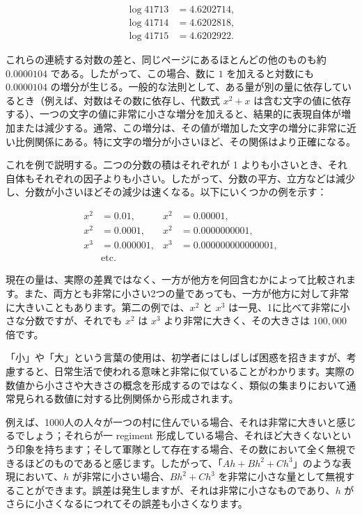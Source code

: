 \documentclass[a4paper,11pt,openany]{ltjsbook}
\begin{document}
\begin{align*}
\log 41713 &= 4.6202714, \\
\log 41714 &= 4.6202818, \\
\log 41715 &= 4.6202922.
\end{align*}

これらの連続する対数の差と、同じページにあるほとんどの他のものも約 $0.0000104$ である。したがって、この場合、数に $1$ を加えると対数にも $0.0000104$ の増分が生じる。一般的な法則として、ある量が別の量に依存しているとき（例えば、対数はその数に依存し、代数式 $x^2 + x$ は含む文字の値に依存する）、一つの文字の値に非常に小さな増分を加えると、結果的に表現自体が増加または減少する。通常、この増分は、その値が増加した文字の増分に非常に近い比例関係にある。特に文字の増分が小さいほど、その関係はより正確になる。

これを例で説明する。二つの分数の積はそれぞれが 1 よりも小さいとき、それ自体もそれぞれの因子よりも小さい。したがって、分数の平方、立方などは減少し、分数が小さいほどその減少は速くなる。以下にいくつかの例を示す：

\begin{align*}
x^2 &= 0.01, & x^2 &= 0.00001, \\
x^2 &= 0.0001, & x^2 &= 0.0000000001, \\
x^3 &= 0.000001, & x^3 &= 0.000000000000001, \\
& \text{etc.} &
\end{align*}

現在の量は、実際の差異ではなく、一方が他方を何回含むかによって比較されます。また、両方とも非常に小さい2つの量であっても、一方が他方に対して非常に大きいこともあります。第二の例では、$x^{2}$ と $x^{3}$ は一見、1に比べて非常に小さな分数ですが、それでも $x^{2}$ は $x^{3}$ より非常に大きく、その大きさは $100,000$ 倍です。

「小」や「大」という言葉の使用は、初学者にはしばしば困惑を招きますが、考慮すると、日常生活で使われる意味と非常に似ていることがわかります。実際の数値から小ささや大きさの概念を形成するのではなく、類似の集まりにおいて通常見られる数値に対する比例関係から形成されます。

例えば、1000人の人々が一つの村に住んでいる場合、それは非常に大きいと感じるでしょう；それらが一 regiment 形成している場合、それほど大きくないという印象を持ちます；そして軍隊として存在する場合、その数において全く無視できるほどのものであると感じます。したがって、「$Ah + Bh^{2} + Ch^{3}$」のような表現において、$h$ が非常に小さい場合、$Bh^{2} + Ch^{3}$ を非常に小さな量として無視することができます。誤差は発生しますが、それは非常に小さなものであり、$h$ がさらに小さくなるにつれてその誤差も小さくなります。
\end{document}
